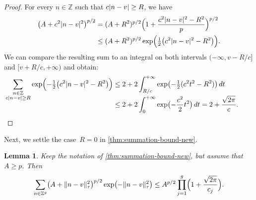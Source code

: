 \documentclass[12pt,oneside]{amsart}
\numberwithin{equation}{section}
\newtheorem{lem}[equation]{Lemma}
\theoremstyle{definition}
\newcommand{\Z}{\mathbb{Z}}
\DeclarePairedDelimiter{\abs}{|}{|}
\DeclarePairedDelimiter{\paren}{(}{)}
\DeclarePairedDelimiter{\norm}{\|}{\|}
\begin{document}
\begin{proof}
  For every $n\in \Z$ such that $c\abs{n-v}\geq R$, we have
  \begin{displaymath}
    \begin{aligned}
      \paren[\big]{A + c^2\abs{n-v}^2}^{p/2}
      &= (A+R^2)^{p/2}
      \paren[\Big]{1 + \frac{c^2\abs{n-v}^2 - R^2}{p}}^{p/2} \\
      &\leq (A+R^2)^{p/2} \exp\paren[\Big]{\tfrac12 \paren[\big]{c^2 \abs{n-v}^2 - R^2}}.
    \end{aligned}
  \end{displaymath}
  We can compare the resulting sum to an integral on both intervals
  $(-\infty, v - R/c]$ and $[v + R/c,+\infty)$ and obtain:
  \begin{align*}
    \sum_{\substack{n\in \Z\\ c\abs{n-v}\geq R}} \exp\paren[\Big]{-\tfrac12
    \paren[\big]{c^2\abs{n-v}^2 - R^2}}
    &\leq 2 + 2\int_{R/c}^{+\infty} \exp \paren[\big]{-\tfrac12
      (c^2 t^2 - R^2)}\,dt\\[-12pt]
    &\leq 2 + 2\int_{0}^{+\infty} \exp \paren[\big]{-\frac{c^2}{2} t^2}\,dt
      = 2 + \frac{\sqrt{2\pi}}{c}. \hspace{7mm}\qedhere
  \end{align*}
\end{proof}

Next, we settle the case~$R = 0$ in \cref{thm:summation-bound-new}.

\begin{lem}
  \label{lem:bound-full}
  Keep the notation of \cref{thm:summation-bound-new}, but assume that $A\geq p$. Then
  \begin{displaymath}
    \sum_{n\in \Z^g} \paren[\big]{A + \norm{n-v}_\tau^2}^{p/2} \exp\paren[\big]{-\norm{n-v}_\tau^2}
    \leq  A^{p/2} \prod_{j=1}^{g} \paren[\Big]{1 + \frac{\sqrt{2\pi}}{c_j}}.
  \end{displaymath}
\end{lem}
\end{document}
